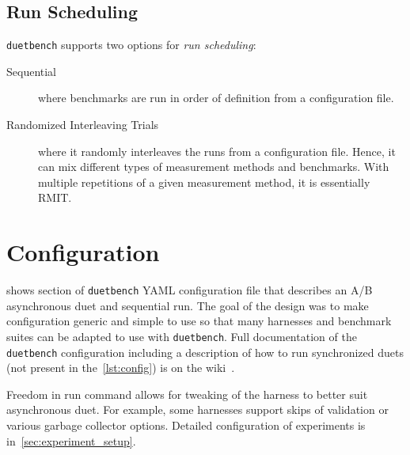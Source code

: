 \subsection{Run Scheduling}
\label{sec:scheduling}

\lstinline{duetbench} supports two options for \emph{run scheduling}:
\begin{description}
    \item[Sequential] where benchmarks are run in order of definition from a configuration file.
    \item[Randomized Interleaving Trials] where it randomly interleaves the runs from a configuration file.
        Hence, it can mix different types of measurement methods and benchmarks.
        With multiple repetitions of a given measurement method, it is essentially RMIT\cite{abedi2017conducting}.
\end{description}

\section{Configuration}
\label{sec:configuration}

 shows section of \lstinline{duetbench} YAML configuration file that describes an A/B asynchronous duet and sequential run.
The goal of the design was to make configuration generic and simple to use so that many harnesses and benchmark suites can be adapted to use with \lstinline{duetbench}.
Full documentation of the \lstinline{duetbench} configuration including a description of how to run synchronized duets (not present in the~\cref{lst:config}) is on the wiki~\cite{wiki}.

Freedom in run command allows for tweaking of the harness to better suit asynchronous duet.
For example, some harnesses support skips of validation or various garbage collector options.
Detailed configuration of experiments is in~\cref{sec:experiment_setup}.

